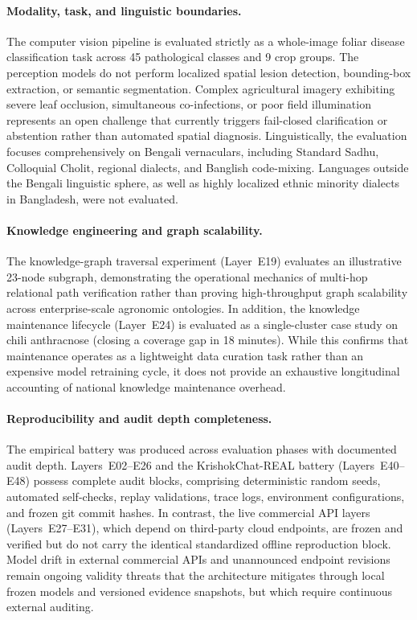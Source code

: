 \documentclass[a4paper,fleqn]{cas-dc}
\begin{document}
\paragraph{Modality, task, and linguistic boundaries.}
The computer vision pipeline is evaluated strictly as a whole-image foliar disease classification task across 45 pathological classes and 9 crop groups. The perception models do not perform localized spatial lesion detection, bounding-box extraction, or semantic segmentation. Complex agricultural imagery exhibiting severe leaf occlusion, simultaneous co-infections, or poor field illumination represents an open challenge that currently triggers fail-closed clarification or abstention rather than automated spatial diagnosis. Linguistically, the evaluation focuses comprehensively on Bengali vernaculars, including Standard Sadhu, Colloquial Cholit, regional dialects, and Banglish code-mixing. Languages outside the Bengali linguistic sphere, as well as highly localized ethnic minority dialects in Bangladesh, were not evaluated.

\paragraph{Knowledge engineering and graph scalability.}
The knowledge-graph traversal experiment (Layer~E19) evaluates an illustrative 23-node subgraph, demonstrating the operational mechanics of multi-hop relational path verification rather than proving high-throughput graph scalability across enterprise-scale agronomic ontologies. In addition, the knowledge maintenance lifecycle (Layer~E24) is evaluated as a single-cluster case study on chili anthracnose (closing a coverage gap in 18 minutes). While this confirms that maintenance operates as a lightweight data curation task rather than an expensive model retraining cycle, it does not provide an exhaustive longitudinal accounting of national knowledge maintenance overhead.

\paragraph{Reproducibility and audit depth completeness.}
The empirical battery was produced across evaluation phases with documented audit depth. Layers~E02--E26 and the KrishokChat-REAL battery (Layers~E40--E48) possess complete audit blocks, comprising deterministic random seeds, automated self-checks, replay validations, trace logs, environment configurations, and frozen git commit hashes. In contrast, the live commercial API layers (Layers~E27--E31), which depend on third-party cloud endpoints, are frozen and verified but do not carry the identical standardized offline reproduction block. Model drift in external commercial APIs and unannounced endpoint revisions remain ongoing validity threats that the architecture mitigates through local frozen models and versioned evidence snapshots, but which require continuous external auditing.
\end{document}
